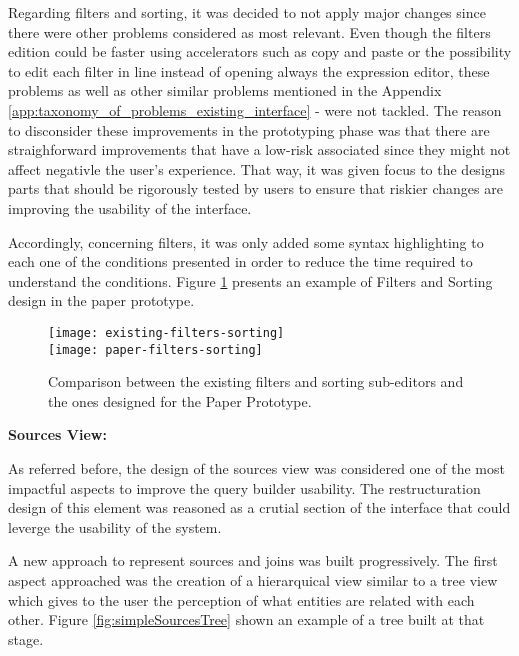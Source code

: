 Regarding filters and sorting, it was decided to not apply major changes since there were other problems considered as most relevant. Even though the filters edition could be faster using accelerators such as copy and paste or the possibility to edit each filter in line instead of opening always the expression editor, these problems as well as other similar problems mentioned in the Appendix \ref{app:taxonomy_of_problems_existing_interface} -  were not tackled. The reason to disconsider these improvements in the prototyping phase was that there are straighforward improvements that have a low-risk associated since they might not affect negativle the user's experience. That way, it was given focus to the designs parts that should be rigorously tested by users to ensure that riskier changes are improving the usability of the interface.

Accordingly, concerning filters, it was only added some syntax highlighting to each one of the conditions presented in order to reduce the time required to understand the conditions. Figure \ref{fig:filtersAndSortingComparison} presents an example of Filters and Sorting design in the paper prototype.

\begin{figure}[tb]
  \centering
    {\texttt{[image: existing-filters-sorting]}}%
    \\
  {\texttt{[image: paper-filters-sorting]}}%
\caption{Comparison between the existing filters and sorting sub-editors and the ones designed for the Paper Prototype.}
  \label{fig:filtersAndSortingComparison}
\end{figure}

\medskip

\textbf{Sources View: }

\medskip

As referred before, the design of the sources view was considered one of the most impactful aspects to improve the query builder usability. The restructuration design of this element was reasoned as a crutial section of the interface that could leverge the usability of the system. 

A new approach to represent sources and joins was built progressively. The first aspect approached was the creation of a hierarquical view similar to a tree view which gives to the user the perception of what entities are related with each other. Figure \ref{fig:simpleSourcesTree} shown an example of a tree built at that stage.

